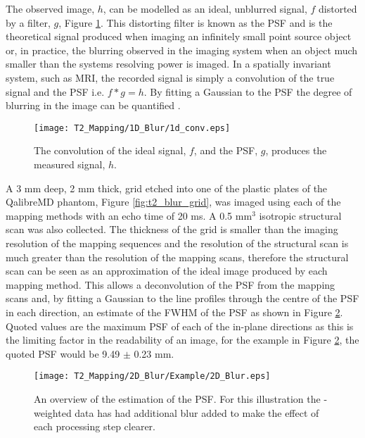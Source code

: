 The observed image, $h$, can be modelled as an ideal, unblurred signal, $f$ distorted by a filter, $g$, Figure \ref{fig:t2_1d_blur}. This distorting filter is known as the \ac{PSF} and is the theoretical signal produced when imaging an infinitely small point source object or, in practice, the blurring observed in the imaging system when an object much smaller than the systems resolving power is imaged. In a spatially invariant system, such as \ac{MRI}, the recorded signal is simply a convolution of the true signal and the \ac{PSF} i.e. $f \ast g = h$. By fitting a Gaussian to the \ac{PSF} the degree of blurring in the image can be quantified \cite{chaimow_more_2017, chaimow_more_2017-1}. 
\begin{figure}[H]
	\centering
	\texttt{[image: T2\_Mapping/1D\_Blur/1d\_conv.eps]}
	\caption{The convolution of the ideal signal, $f$, and the \ac{PSF}, $g$, produces the measured signal, $h$.}
	\label{fig:t2_1d_blur}	
\end{figure}

A 3 mm deep, 2 mm thick, grid etched into one of the plastic plates of the QalibreMD phantom, Figure \ref{fig:t2_blur_grid}, was imaged using each of the \ttwo mapping methods with an echo time of 20 ms. A 0.5 mm$^3$ isotropic structural scan was also collected. The thickness of the grid is smaller than the imaging resolution of the \ttwo mapping sequences and the resolution of the structural scan is much greater than the resolution of the \ttwo mapping scans, therefore the structural scan can be seen as an approximation of the ideal image produced by each \ttwo mapping method. This allows a deconvolution of the \ac{PSF} from the \ttwo mapping scans and, by fitting a Gaussian to the line profiles through the centre of the \ac{PSF} in each direction, an estimate of the \ac{FWHM} of the \ac{PSF} as shown in Figure \ref{fig:t2_2d_blur}. Quoted values are the maximum \ac{PSF} of each of the in-plane directions as this is the limiting factor in the readability of an image, for the example in Figure \ref{fig:t2_2d_blur}, the quoted \ac{PSF} would be 9.49 $\pm$ 0.23 mm.

\begin{figure}[H]
	\centering
	\texttt{[image: T2\_Mapping/2D\_Blur/Example/2D\_Blur.eps]}
	\caption{An overview of the estimation of the \ac{PSF}. For this illustration the \ttwo-weighted data has had additional blur added to make the effect of each processing step clearer.}
	\label{fig:t2_2d_blur}	
\end{figure}

